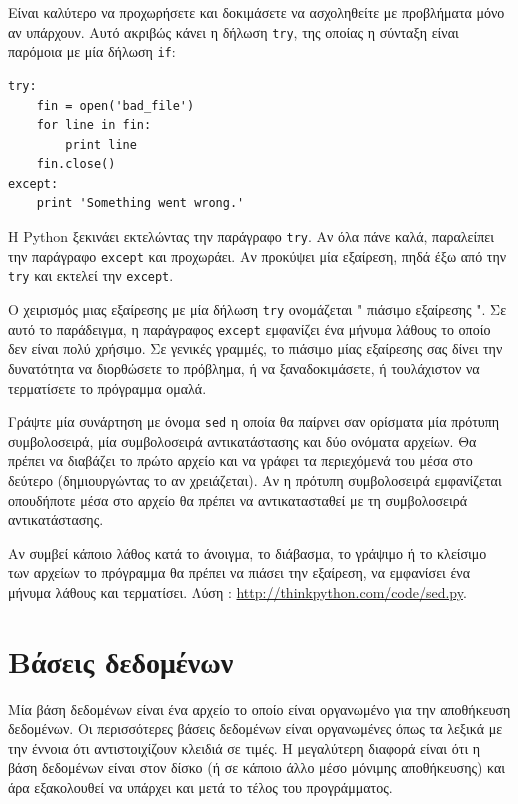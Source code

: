\documentclass[10pt]{book}
\begin{document}
Είναι καλύτερο να προχωρήσετε και δοκιμάσετε να ασχοληθείτε με προβλήματα μόνο αν υπάρχουν. Αυτό ακριβώς κάνει η δήλωση  {\tt try},  της οποίας η σύνταξη είναι παρόμοια με μία δήλωση  {\tt if}: 

\begin{verbatim}
try:
    fin = open('bad_file')
    for line in fin:
        print line
    fin.close()
except:
    print 'Something went wrong.'
\end{verbatim}
%
 Η  Python  ξεκινάει εκτελώντας την παράγραφο  {\tt try}.  Αν όλα πάνε καλά, παραλείπει την παράγραφο  {\tt except}  και προχωράει. Αν προκύψει μία εξαίρεση, πηδά έξω από την  {\tt try}  και εκτελεί την  {\tt except}.

 Ο χειρισμός μιας εξαίρεσης με μία δήλωση  {\tt try}  ονομάζεται  " πιάσιμο εξαίρεσης ".  Σε αυτό το παράδειγμα, η παράγραφος  {\tt except}  εμφανίζει ένα 
μήνυμα λάθους το οποίο δεν είναι πολύ χρήσιμο. Σε γενικές γραμμές, το πιάσιμο μίας εξαίρεσης 
σας δίνει την δυνατότητα να διορθώσετε το πρόβλημα, ή να ξαναδοκιμάσετε, ή τουλάχιστον να 
τερματίσετε το πρόγραμμα ομαλά.

\begin{exercise}

Γράψτε μία συνάρτηση με όνομα  {\tt sed}  η οποία θα παίρνει σαν ορίσματα μία πρότυπη συμβολοσειρά, μία συμβολοσειρά αντικατάστασης και δύο ονόματα αρχείων. Θα πρέπει να διαβάζει 
το πρώτο αρχείο και να γράφει τα περιεχόμενά του μέσα στο δεύτερο (δημιουργώντας το αν χρειάζεται). Αν η πρότυπη συμβολοσειρά εμφανίζεται οπουδήποτε μέσα στο αρχείο θα πρέπει να αντικατασταθεί με τη συμβολοσειρά αντικατάστασης.

Αν συμβεί κάποιο λάθος κατά το άνοιγμα, το διάβασμα, το γράψιμο ή το κλείσιμο των αρχείων το 
πρόγραμμα θα πρέπει να πιάσει την εξαίρεση, να εμφανίσει ένα μήνυμα λάθους και τερματίσει. Λύση : \url{http://thinkpython.com/code/sed.py}.
\end{exercise}

 
\section{Βάσεις δεδομένων}

Μία βάση δεδομένων είναι ένα αρχείο το οποίο είναι οργανωμένο για την αποθήκευση δεδομένων. 
Οι περισσότερες βάσεις δεδομένων είναι οργανωμένες όπως τα λεξικά με την έννοια ότι αντιστοιχίζουν κλειδιά σε τιμές. Η μεγαλύτερη διαφορά είναι ότι η βάση δεδομένων είναι στον δίσκο (ή σε κάποιο άλλο μέσο μόνιμης αποθήκευσης) και άρα εξακολουθεί να υπάρχει και μετά το τέλος του προγράμματος.
\end{document}
